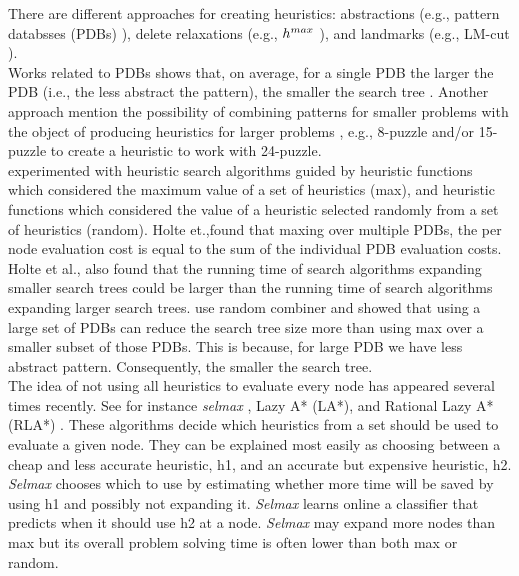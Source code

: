\documentclass[a4paper,12pt]{article}
\begin{document}
There are different approaches for creating heuristics: abstractions (e.g., pattern databsses (PDBs) \citep{culberson1996searching}), delete relaxations (e.g., $h\sp{max}$ \citep{bonet2001planning}), and landmarks (e.g., LM-cut \citep{helmert2009landmarks}).\\

Works related to PDBs shows that, on average, for a single PDB the larger the PDB (i.e., the less abstract the pattern), the smaller the search tree \citep{holte1999space}. Another approach mention the possibility of combining patterns for smaller problems with the object of producing heuristics for larger problems \citep{culberson1998pattern}, e.g., 8-puzzle and/or 15-puzzle to create a heuristic to work with 24-puzzle.\\

\citep{holte2004multiple} experimented with heuristic search algorithms guided by heuristic functions which considered the maximum value of a set of heuristics (max), and heuristic functions which considered the value of a heuristic selected randomly from a set of heuristics (random). Holte et.,found that maxing over multiple PDBs, the per node evaluation cost is equal to the sum of the individual PDB evaluation costs. Holte et al., also found that the running time of search algorithms expanding smaller search trees could be larger than the running time of search algorithms expanding larger search trees. \citep{zahavi2007inconsistent} use random combiner and showed that using a large set of PDBs can reduce the search tree size more than using max over a smaller subset of those PDBs. This is because, for large PDB we have less abstract pattern. Consequently, the smaller the search tree.\\

The idea of not using all heuristics to evaluate every node has appeared several times recently. See for instance \textit{selmax} \citet{domshlak2011selmax}, Lazy A* (LA*), and Rational Lazy A* (RLA*) \citep{tolpin2013towards}. These algorithms decide which heuristics from a set should be used to evaluate a given node. They can be explained most easily as choosing between a cheap and less accurate heuristic, h1, and an accurate but expensive heuristic, h2. \textit{Selmax} chooses which to use by estimating whether more time will be saved by using h1 and possibly not expanding it. \textit{Selmax} learns online a classifier that predicts when it should use h2 at a node. \textit{Selmax} may expand more nodes than max but its overall problem solving time is often lower than both max or random.\\
\end{document}
